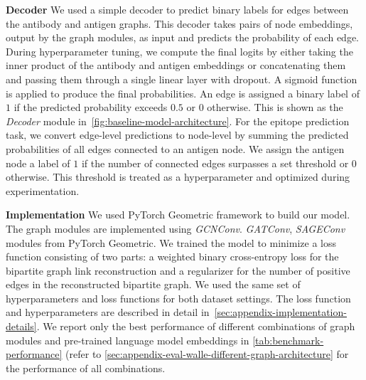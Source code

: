 \documentclass[11pt]{article}
\begin{document}

\textbf{Decoder} We used a simple decoder to predict binary labels for edges between the antibody and antigen graphs. 
This decoder takes pairs of node embeddings, output by the graph modules, as input and predicts the probability of each edge. 
During hyperparameter tuning, we compute the final logits by either taking the inner product of the antibody and antigen embeddings or concatenating them and passing them through a single linear layer with dropout. 
A sigmoid function is applied to produce the final probabilities.
% 
An edge is assigned a binary label of $1$ if the predicted probability exceeds $0.5$ or $0$ otherwise. 
This is shown as the \textit{Decoder} module in~\cref{fig:baseline-model-architecture}.
For the epitope prediction task, we convert edge-level predictions to node-level by summing the predicted probabilities of all edges connected to an antigen node.
We assign the antigen node a label of $1$ if the number of connected edges surpasses a set threshold or $0$ otherwise. 
This threshold is treated as a hyperparameter and optimized during experimentation.


\textbf{Implementation} We used PyTorch Geometric \citep{pytorch_geometric} framework to build our model.
The graph modules are implemented using \textit{GCNConv}. \textit{GATConv}, \textit{SAGEConv} modules from PyTorch Geometric.
We trained the model to minimize a loss function consisting of two parts:
a weighted binary cross-entropy loss for the bipartite graph link reconstruction and a regularizer for the number of positive edges in the reconstructed bipartite graph.
We used the same set of hyperparameters and loss functions for both dataset settings.
The loss function and hyperparameters are described in detail in~\cref{sec:appendix-implementation-details}. 
We report only the best performance of different combinations of graph modules and pre-trained language model embeddings in \cref{tab:benchmark-performance} (refer to \cref{sec:appendix-eval-walle-different-graph-architecture} for the performance of all combinations. 

\end{document}
